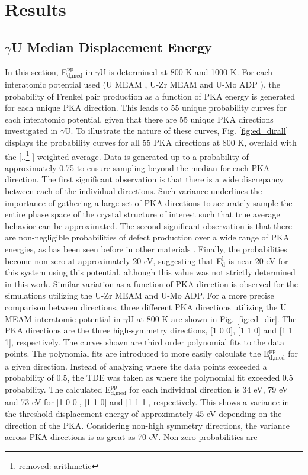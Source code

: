 \documentclass[review]{elsarticle}
\providecommand{\DIFaddtex}[1]{{\protect\color{blue} \sf #1}} %
\providecommand{\DIFdeltex}[1]{{\protect\color{red} [..\footnote{removed: #1} ]}} %
\providecommand{\DIFaddbegin}{} %
\providecommand{\DIFaddend}{} %
\providecommand{\DIFdelbegin}{} %
\providecommand{\DIFdelend}{} %
\providecommand{\DIFadd}[1]{\texorpdfstring{\DIFaddtex{#1}}{#1}} %
\providecommand{\DIFdel}[1]{\texorpdfstring{\DIFdeltex{#1}}{}} %
\newcommand{\DIFscaledelfig}{0.5}
\newlength{\DIFdelgraphicswidth} %
\newlength{\DIFdelgraphicsheight} %
\newcommand{\DIFaddincludegraphics}[2][]{{\color{blue}\fbox{\DIFOincludegraphics[#1]{#2}}}} %
\newcommand{\DIFdelincludegraphics}[2][]{%
\sbox{\DIFdelgraphicsbox}{\DIFOincludegraphics[#1]{#2}}%
\settoboxwidth{\DIFdelgraphicswidth}{\DIFdelgraphicsbox} %
\settoboxtotalheight{\DIFdelgraphicsheight}{\DIFdelgraphicsbox} %
\scalebox{\DIFscaledelfig}{%
\parbox[b]{\DIFdelgraphicswidth}{\usebox{\DIFdelgraphicsbox}\\[-\baselineskip] \rule{\DIFdelgraphicswidth}{0em}}\llap{\resizebox{\DIFdelgraphicswidth}{\DIFdelgraphicsheight}{%
\setlength{\unitlength}{\DIFdelgraphicswidth}%
\begin{picture}(1,1)%
\thicklines\linethickness{2pt} %
{\color[rgb]{1,0,0}\put(0,0){\framebox(1,1){}}}%
{\color[rgb]{1,0,0}\put(0,0){\line( 1,1){1}}}%
{\color[rgb]{1,0,0}\put(0,1){\line(1,-1){1}}}%
\end{picture}%
}\hspace*{3pt}}} %
} %
\DeclareRobustCommand{\DIFaddbegin}{\DIFOaddbegin \let\includegraphics\DIFaddincludegraphics} %
\DeclareRobustCommand{\DIFaddend}{\DIFOaddend \let\includegraphics\DIFOincludegraphics} %
\DeclareRobustCommand{\DIFdelbegin}{\DIFOdelbegin \let\includegraphics\DIFdelincludegraphics} %
\DeclareRobustCommand{\DIFdelend}{\DIFOaddend \let\includegraphics\DIFOincludegraphics} %
\begin{document}
\FloatBarrier

\section{Results}
\subsection{$\gamma$U Median Displacement Energy}

In this section, E$^{\textrm{pp}}_{\textrm{d,med}}$ in $\gamma$U is determined at 800 K and 1000 K. For each interatomic potential used (U MEAM \cite{beeler_meam}, U-Zr MEAM \cite{moore2015} and U-Mo ADP \cite{smirnovaADP}), the probability of Frenkel pair production as a function of PKA energy is generated for each unique PKA direction. This leads to 55 unique probability curves for each interatomic potential, given that there are 55 unique PKA directions investigated in $\gamma$U. To illustrate the nature of these curves, Fig. \ref{fig:ed_dirall} displays the probability curves for all 55 PKA directions at 800 K, overlaid with the \DIFdelbegin \DIFdel{arithmetic }\DIFdelend \DIFaddbegin \DIFadd{weighted }\DIFaddend average. Data is generated up to a probability of approximately 0.75 to ensure sampling beyond the median for each PKA direction. The first significant observation is that there is a wide discrepancy between each of the individual directions. Such variance underlines the importance of gathering a large set of PKA directions to accurately sample the entire phase space of the crystal structure of interest such that true average behavior can be approximated. The second significant observation is that there are non-negligible probabilities of defect production over a wide range of PKA energies, as has been seen before in other materials \cite{beeler2016, nordlund2006, zepeda-ruiz2003, tsuchihira2013}. Finally, the probabilities become non-zero at approximately 20 eV, suggesting that E$^{\textrm{l}}_{\textrm{d}}$ is near 20 eV for this system using this potential, although this value was not strictly determined in this work. Similar variation as a function of PKA direction is observed for the simulations utilizing the U-Zr MEAM and U-Mo ADP. For a more precise comparison between directions, three different PKA directions utilizing the U MEAM interatomic potential in $\gamma$U at 800 K are shown in Fig. \ref{fig:ed_dir}. The PKA directions are the three high-symmetry directions, [1 0 0], [1 1 0] and [1 1 1], respectively. The curves shown are third order polynomial fits to the data points. The polynomial fits are introduced to more easily calculate the E$^{\textrm{pp}}_{\textrm{d,med}}$ for a given direction. Instead of analyzing where the data points exceeded a probability of 0.5, the TDE was taken as where the polynomial fit exceeded 0.5 probability. The calculated E$^{\textrm{pp}}_{\textrm{d,med}}$ for each individual direction is 34 eV, 79 eV and 73 eV for [1 0 0], [1 1 0] and [1 1 1], respectively. This shows a variance in the threshold displacement energy of approximately 45 eV depending on the direction of the PKA. Considering non-high symmetry directions, the variance across PKA directions is as great as 70 eV. Non-zero probabilities are 
\end{document}
